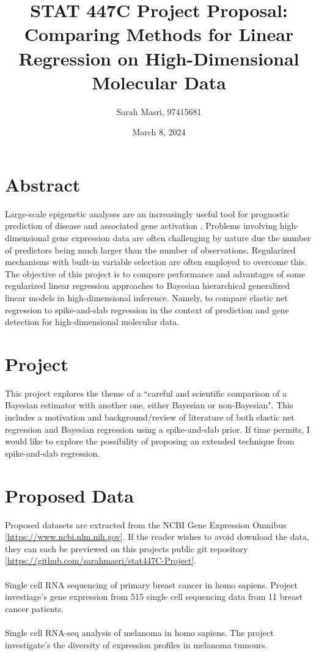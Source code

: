 \documentclass[12pt]{extarticle}
\title{\myfont STAT 447C Project Proposal: Comparing Methods for Linear Regression on High-Dimensional Molecular Data}
\author{Sarah Masri, 97415681}
\date{March 8, 2024}
\begin{document}
\maketitle

\section{Abstract}

\noindent Large-scale epigenetic analyses are an increasingly useful tool for prognostic prediction of disease and associated gene activation \cite{Tang2017}. Problems involving high-dimensional gene expression data are often challenging by nature due the number of predictors being much larger than the number of observations. Regularized mechanisms with built-in variable selection are often employed to overcome this. The objective of this project is to compare performance and advantages of some regularized linear regression approaches to Bayesian hierarchical generalized linear models in high-dimensional inference. Namely, to compare elastic net regression to spike-and-slab regression in the context of prediction and gene detection for high-dimensional molecular data. 

\section{Project}

\noindent This project explores the theme of a ``careful and scientific comparison of a Bayesian estimator with another one, either Bayesian or non-Bayesian". This includes a motivation and background/review of literature of both elastic net regression and Bayesian regression using a spike-and-slab prior. If time permits, I would like to explore the possibility of proposing an extended technique from spike-and-slab regression.  

\section{Proposed Data}
\noindent Proposed datasets are extracted from the NCBI Gene Expression Omnibus [\url{https://www.ncbi.nlm.nih.gov}]. If the reader wishes to avoid download the data, they can each be previewed on this projects public git repository [\url{https://github.com/sarahmasri/stat447C-Project}]. 
\\
\\
  Single cell RNA sequencing of primary breast cancer in homo sapiens. Project investiage's gene expression from 515 single cell sequencing data from 11 breast cancer patients.
\newline [\url{https://www.ncbi.nlm.nih.gov/geo/query/acc.cgi?acc=GSE75688}]
\\
\\
 	Single cell RNA-seq analysis of melanoma in homo sapiens. The project investigate's the diversity of expression profiles in melanoma tumours.
\newline  [\url{https://www.ncbi.nlm.nih.gov/geo/query/acc.cgi?acc=GSE72056}]
\end{document}

